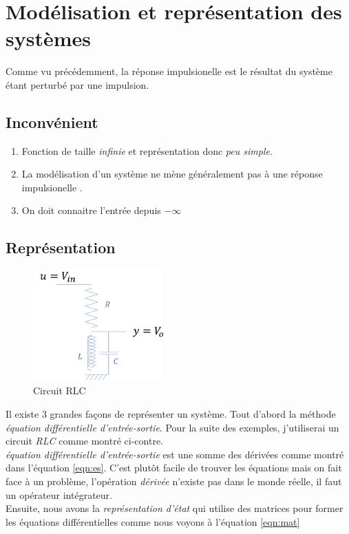 \documentclass{report}
\begin{document}
\section{Modélisation et représentation des systèmes}
Comme vu précédemment, la réponse impulsionelle est le résultat du système étant perturbé par une impulsion. 
\subsection{Inconvénient}
\begin{enumerate}
\item Fonction de taille \textit{infinie} et représentation donc \textit{peu simple}.
\item La modélisation d'un système ne mène généralement pas à une réponse impulsionelle .
\item On doit connaitre l'entrée depuis $-\infty$
\end{enumerate}

\subsection{Représentation}
\begin{figure}
\includegraphics[width=5cm]{img/RLC.png}
\caption{Circuit RLC}
\label{fig:RLC}
\end{figure}
Il existe 3 grandes façons de représenter un système. Tout d'abord la méthode \textit{équation différentielle d'entrée-sortie}. Pour la suite des exemples, j'utiliserai un circuit \textit{RLC} comme montré ci-contre.\\

\textit{équation différentielle d'entrée-sortie} est une somme des dérivées comme montré dans l'équation \ref{eqn:es}. C'est plutôt facile de trouver les équations mais on fait face à un problème, l'opération \textit{dérivée} n'existe pas dans le monde réelle, il faut un opérateur intégrateur.\\

Ensuite, nous avons la \textit{représentation d'état} qui utilise des matrices pour former les équations différentielles comme nous voyons à l'équation \ref{eqn:mat}\\
\end{document}
